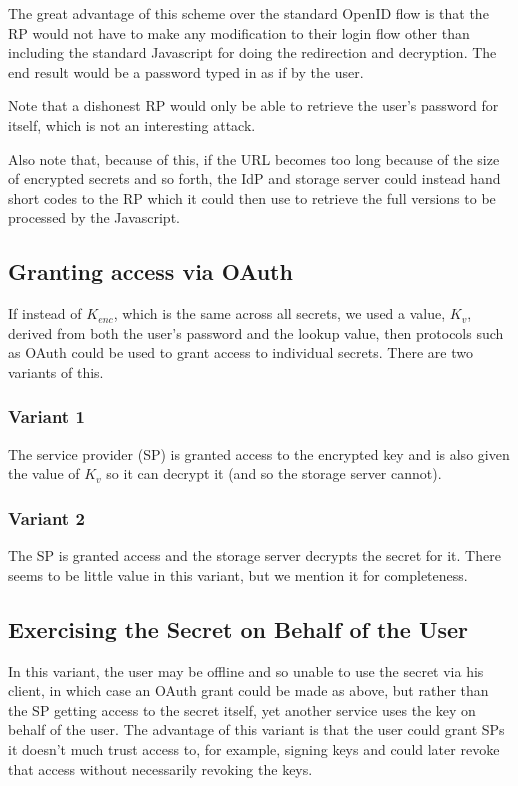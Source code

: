 \documentclass[a4paper,titlepage]{article}
\begin{document}
The great advantage of this scheme over the standard OpenID flow is
that the RP would not have to make any modification to their login
flow other than including the standard Javascript for doing the
redirection and decryption. The end result would be a password typed
in as if by the user.

Note that a dishonest RP would only be able to retrieve the user's
password for itself, which is not an interesting attack.

Also note that, because of this, if the URL becomes too long because
of the size of encrypted secrets and so forth, the IdP and storage
server could instead hand short codes to the RP which it could then
use to retrieve the full versions to be processed by the Javascript.

\subsection{Granting access via OAuth}

If instead of $K_{enc}$, which is the same across all secrets, we used
a value, $K_v$, derived from both the user's password and the lookup
value, then protocols such as OAuth could be used to grant access to
individual secrets. There are two variants of this.

\subsubsection{Variant 1}

The service provider (SP) is granted access to the encrypted key and
is also given the value of $K_v$ so it can decrypt it (and so the
storage server cannot).

\subsubsection{Variant 2}

The SP is granted access and the storage server decrypts the secret for it. There seems to be little value in this variant, but we mention it for completeness.

\subsection{Exercising the Secret on Behalf of the User}

In this variant, the user may be offline and so unable to use the
secret via his client, in which case an OAuth grant could be made as
above, but rather than the SP getting access to the secret itself, yet
another service uses the key on behalf of the user. The advantage of
this variant is that the user could grant SPs it doesn't much trust
access to, for example, signing keys and could later revoke that
access without necessarily revoking the keys.
\end{document}

